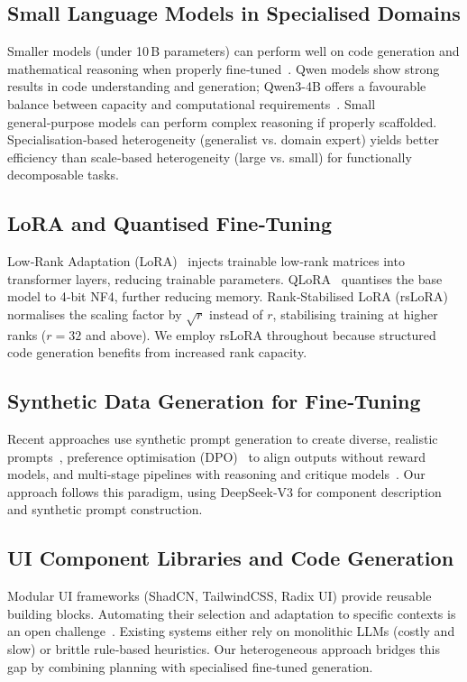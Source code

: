 \documentclass[pdflatex,sn-mathphys-num]{sn-jnl}
\theoremstyle{thmstyleone}
\theoremstyle{thmstyletwo}
\theoremstyle{thmstylethree}
\begin{document}
\subsection{Small Language Models in Specialised Domains}
Smaller models (under 10 B parameters) can perform well on code generation and mathematical reasoning when properly fine‑tuned~\cite{ref4}. Qwen models show strong results in code understanding and generation; Qwen3-4B offers a favourable balance between capacity and computational requirements~\cite{ref5}. Small general‑purpose models can perform complex reasoning if properly scaffolded. Specialisation‑based heterogeneity (generalist vs. domain expert) yields better efficiency than scale‑based heterogeneity (large vs. small) for functionally decomposable tasks.

\subsection{LoRA and Quantised Fine‑Tuning}
Low‑Rank Adaptation (LoRA)~\cite{ref12} injects trainable low‑rank matrices into transformer layers, reducing trainable parameters. QLoRA~\cite{ref13} quantises the base model to 4‑bit NF4, further reducing memory. Rank‑Stabilised LoRA (rsLoRA)~\cite{ref17} normalises the scaling factor by $\sqrt{r}$ instead of $r$, stabilising training at higher ranks ($r=32$ and above). We employ rsLoRA throughout because structured code generation benefits from increased rank capacity.

\subsection{Synthetic Data Generation for Fine‑Tuning}
Recent approaches use synthetic prompt generation to create diverse, realistic prompts~\cite{ref6}, preference optimisation (DPO)~\cite{ref7} to align outputs without reward models, and multi‑stage pipelines with reasoning and critique models~\cite{ref8}. Our approach follows this paradigm, using DeepSeek-V3 for component description and synthetic prompt construction.

\subsection{UI Component Libraries and Code Generation}
Modular UI frameworks (ShadCN, TailwindCSS, Radix UI) provide reusable building blocks. Automating their selection and adaptation to specific contexts is an open challenge~\cite{ref9}. Existing systems either rely on monolithic LLMs (costly and slow) or brittle rule‑based heuristics. Our heterogeneous approach bridges this gap by combining planning with specialised fine‑tuned generation.
\end{document}
